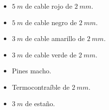 \begin{itemize}
	\item $5 \ m$ de cable rojo de $2 \ mm$.
	\item $5 \ m$ de cable negro de $2 \ mm$.
	\item $3 \ m$ de cable amarillo de $2 \ mm$.
	\item $3 \ m$ de cable verde de $2 \ mm$.
	\item Pines macho.
	\item Termocontraíble de $2 \ mm$.
	\item $3  \ m$ de estaño.
\end{itemize}









